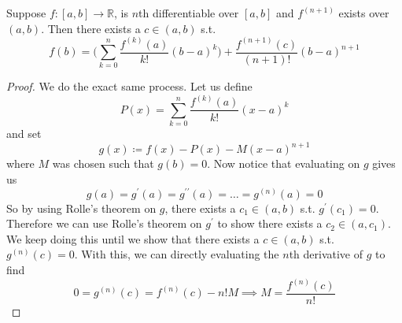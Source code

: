   \begin{theorem}
    Suppose $f: [a, b] \to \mathbb{R}$, is $n$th differentiable over $[a, b]$ and $f^{(n+1)}$ exists over $(a, b)$. Then there exists a $c \in (a, b)$ s.t. 
    \begin{equation}
      f(b) = \bigg( \sum_{k=0}^n \frac{f^{(k)}(a)}{k!} (b - a)^k  \bigg) + \frac{f^{(n+1)} (c)}{(n+1)!} (b - a)^{n+1}
    \end{equation}
  \end{theorem}
  \begin{proof}
    We do the exact same process. Let us define 
    \begin{equation}
      P(x) = \sum_{k=0}^n \frac{f^{(k)} (a)}{k!} (x - a)^k
    \end{equation} 
    and set 
    \begin{equation}
      g(x) \coloneqq f(x) - P(x) - M (x - a)^{n+1}
    \end{equation} 
    where $M$ was chosen such that $g(b) = 0$. Now notice that evaluating on $g$ gives us 
    \begin{equation}
      g(a) = g^\prime (a) = g^{\prime\prime} (a) = \ldots = g^{(n)} (a) = 0 
    \end{equation} 
    So by using Rolle's theorem on $g$, there exists a $c_1 \in (a, b)$ s.t. $g^\prime (c_1) = 0$. Therefore we can use Rolle's theorem on $g^\prime$ to show there exists a $c_2 \in (a, c_1)$. We keep doing this until we show that there exists a $c \in (a, b)$ s.t. $g^{(n)} (c) = 0$. With this, we can directly evaluating the $n$th derivative of $g$ to find 
    \begin{equation}
      0 = g^{(n)} (c) = f^{(n)} (c) - n! M \implies M = \frac{f^{(n)} (c)}{n!}
    \end{equation}
  \end{proof}

